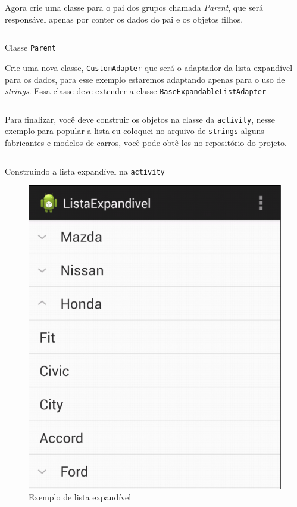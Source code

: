 \documentclass[a4paper,12pt,brazil,doubleside]{book}
\begin{document}
\begin{singlespace}
Agora crie uma classe para o pai dos grupos chamada \emph{Parent}, que será responsável apenas por conter os dados do pai e os objetos filhos.

\begin{listing}[H]
\inputminted[linenos=true,fontsize=\small,frame=lines, framesep=2mm, tabsize=2,numbersep=5pt]{java}{src/design/parent.java}
\caption{Classe \texttt{Parent}}
\end{listing}	

\newpage

Crie uma nova classe, \texttt{CustomAdapter} que será o adaptador da lista expandível para os dados, para esse exemplo estaremos adaptando apenas para o uso de \emph{strings}.
Essa classe deve extender a classe \texttt{BaseExpandableListAdapter} 

\inputminted[linenos=true,fontsize=\small,frame=lines, framesep=2mm, tabsize=2,numbersep=5pt]{java}{src/design/customadapter.java}


Para finalizar, você deve construir os objetos na classe da \texttt{activity}, nesse exemplo para popular a lista eu coloquei no arquivo de \texttt{strings} alguns fabricantes e modelos de carros, você pode obtê-los no repositório do projeto.

\begin{listing}[H]
\inputminted[linenos=true,fontsize=\small,frame=lines, framesep=2mm, tabsize=2,numbersep=5pt]{java}{src/design/exlist-main.java}
\caption{Construindo a lista expandível na \texttt{activity}}
\end{listing}	

\begin{figure}[H]
  \centering
  \includegraphics[width=.475\textwidth]{figuras/design/listaexpandivel.png}
  \caption{Exemplo de lista expandível}
  \label{fig:e}
\end{figure}


\end{singlespace}
\end{document}
